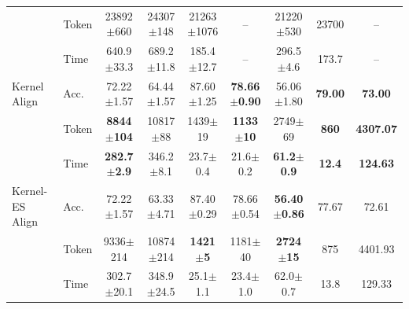 \documentclass{article} %
\begin{document}
\begin{table}[t]
{{\begin{tabular}{@{}ll*{7}{c}@{}}
 & Token & 23892$\pm$660 & 24307$\pm$148 & 21263$\pm$1076 & -- & 21220$\pm$530 & 23700 & -- \\
 & Time & 640.9$\pm$33.3 & 689.2$\pm$11.8 & 185.4$\pm$12.7 & -- & 296.5$\pm$4.6 & 173.7 & -- \\
\midrule
Kernel Align & Acc. & 72.22$\pm$1.57 & 64.44$\pm$1.57 & 87.60$\pm$1.25 & \textbf{78.66$\pm$0.90} & 56.06$\pm$1.80 & \textbf{79.00} & \textbf{73.00} \\
 & Token & \textbf{8844$\pm$104} & 10817$\pm$88 & 1439$\pm$19 & \textbf{1133$\pm$10} & 2749$\pm$69 & \textbf{860} & \textbf{4307.07} \\
 & Time & \textbf{282.7$\pm$2.9} & 346.2$\pm$8.1 & 23.7$\pm$0.4 & 21.6$\pm$0.2 & \textbf{61.2$\pm$0.9} & \textbf{12.4} & \textbf{124.63} \\
\midrule
Kernel-ES Align & Acc. & 72.22$\pm$1.57 & 63.33$\pm$4.71 & 87.40$\pm$0.29 & 78.66$\pm$0.54 & \textbf{56.40$\pm$0.86} & 77.67 & 72.61 \\
 & Token & 9336$\pm$214 & 10874$\pm$214 & \textbf{1421$\pm$5} & 1181$\pm$40 & \textbf{2724$\pm$15} & 875 & 4401.93 \\
 & Time & 302.7$\pm$20.1 & 348.9$\pm$24.5 & 25.1$\pm$1.1 & 23.4$\pm$1.0 & 62.0$\pm$0.7 & 13.8 & 129.33 \\
\bottomrule
\end{tabular}%
}%
}
\end{table}
\end{document}
